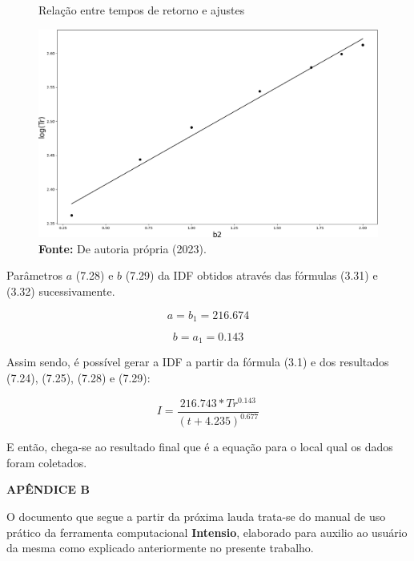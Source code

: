 \begin{figure}[!ht]
	\centering
	\caption{Relação entre tempos de retorno e ajustes}
	\includegraphics[width=.7325\linewidth]{figuras/apendice_reta_de_tempo_de_retorno.png}
	\caption*{\textbf{Fonte:} De autoria própria (2023).}
	\label{fig:apendice_reta_de_tempo_de_retorno.png}
\end{figure}

\newpage

Parâmetros $a$ (7.28) e $b$ (7.29) da IDF obtidos através das fórmulas (3.31) e (3.32) sucessivamente.\bigskip

\begin{equation}
a = b_1 = 216.674
\end{equation}

\begin{equation}
b = a_1 = 0.143
\end{equation}\bigskip

Assim sendo, é possível gerar a IDF a partir da fórmula (3.1) e dos resultados (7.24), (7.25), (7.28) e (7.29):\bigskip

\begin{equation}
I = \frac{216.743 * Tr^{0.143}}{(t + 4.235)^{0.677}}
\end{equation}\bigskip

E então, chega-se ao resultado final que é a equação para o local qual os dados foram coletados.\bigskip\bigskip


\begin{center}
\noindent\textbf{APÊNDICE B}
\end{center}

O documento que segue a partir da próxima lauda trata-se do manual de uso prático da ferramenta computacional \textbf{Intensio}, elaborado para auxilio ao usuário da mesma como explicado anteriormente no presente trabalho.


